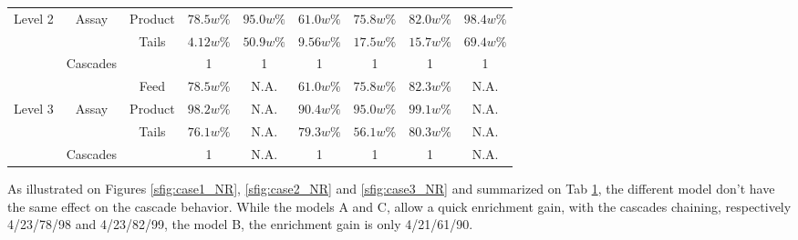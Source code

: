 \begin{table}[h!]
\begin{tabular}{ccccccccc}
Level 2 & Assay      & Product   & $78.5w\%$ & $95.0w\%$ & $61.0w\%$ & $75.8w\%$ & $82.0w\%$ & $98.4w\%$ \\
        &            & Tails     & $4.12w\%$ & $50.9w\%$ & $9.56w\%$ & $17.5w\%$ & $15.7w\%$ & $69.4w\%$ \\
        & Cascades   &           & 1         & 1         & 1         & 1         & 1         & 1         \\
\midrule                                                                                                 
        &            & Feed      & $78.5w\%$ & N.A.      & $61.0w\%$ & $75.8w\%$ & $82.3w\%$ & N.A.      \\
Level 3 & Assay      & Product   & $98.2w\%$ & N.A.      & $90.4w\%$ & $95.0w\%$ & $99.1w\%$ & N.A.      \\
        &            & Tails     & $76.1w\%$ & N.A.      & $79.3w\%$ & $56.1w\%$ & $80.3w\%$ & N.A.      \\
        & Cascades   &           & 1         & N.A.      & 1         & 1         & 1         & N.A.      \\
\bottomrule
\end{tabular}
  \label{tab:level}
\end{table}

As illustrated on Figures \ref{sfig:case1_NR}, \ref{sfig:case2_NR} and
\ref{sfig:case3_NR} and summarized on Tab \ref{tab:level}, the different model
don't have the same effect on the cascade behavior. While the models A and C,
allow a quick enrichment gain, with the cascades chaining, respectively
4/23/78/98 and 4/23/82/99, the model B, the enrichment gain is only
4/21/61/90. 


